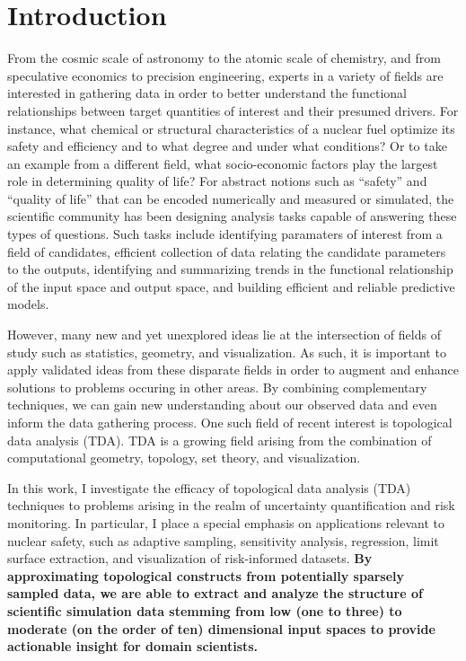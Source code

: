 
\chapter{Introduction}

From the cosmic scale of astronomy to the atomic scale of chemistry, and from speculative economics to precision engineering, experts in a variety of fields are interested in gathering data in order to better understand the functional relationships between target quantities of interest and their presumed drivers.
%
For instance, what chemical or structural characteristics of a nuclear fuel optimize its safety and efficiency and to what degree and under what conditions?
%
Or to take an example from a different field, what socio-economic factors play the largest role in determining quality of life?
%
For abstract notions such as ``safety'' and ``quality of life'' that can be encoded numerically and measured or simulated, the scientific community has been designing analysis tasks capable of answering these types of questions.
%
Such tasks include identifying paramaters of interest from a field of candidates, efficient collection of data relating the candidate parameters to the outputs, identifying and summarizing trends in the functional relationship of the input space and output space, and building efficient and reliable predictive models.

However, many new and yet unexplored ideas lie at the intersection of fields of study such as statistics, geometry, and visualization.
%
As such, it is important to apply validated ideas from these disparate fields in order to augment and enhance solutions to problems occuring in other areas.
%
By combining complementary techniques, we can gain new understanding about our observed data and even inform the data gathering process.
%
One such field of recent interest is topological data analysis (TDA).
%
TDA is a growing field arising from the combination of computational geometry, topology, set theory, and visualization.

In this work, I investigate the efficacy of topological data analysis (TDA) techniques to problems arising in the realm of uncertainty quantification and risk monitoring.
%
In particular, I place a special emphasis on applications relevant to nuclear safety, such as adaptive sampling, sensitivity analysis, regression, limit surface extraction, and visualization of risk-informed datasets.
%
\textbf{By approximating topological constructs from potentially sparsely
sampled data, we are able to extract and analyze the structure of scientific simulation data stemming from low (one to three) to moderate (on the order of ten) dimensional input spaces to provide actionable insight for domain
scientists.}

